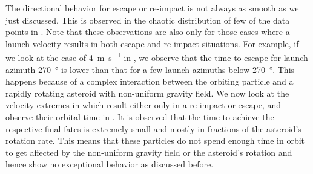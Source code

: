 %
\newline\newline
%
The directional behavior for escape or re-impact is not always as smooth as we just discussed. This is observed in the chaotic distribution of few of the data points in . Note that these observations are also only for those cases where a launch velocity results in both escape and re-impact situations. For example, if we look at the case of \SI{4}{\metre\per\second} in , we observe that the time to escape for launch azimuth \SI{270}{\degree} is lower than that for a few launch azimuths below \SI{270}{\degree}. This happens because of a complex interaction between the orbiting particle and a rapidly rotating asteroid with non-uniform gravity field. We now look at the velocity extremes in  which result either only in a re-impact or escape, and observe their orbital time in . It is observed that the time to achieve the respective final fates is extremely small and mostly in fractions of the asteroid's rotation rate. This means that these particles do not spend enough time in orbit to get affected by the non-uniform gravity field or the asteroid's rotation and hence show no exceptional behavior as discussed before.

